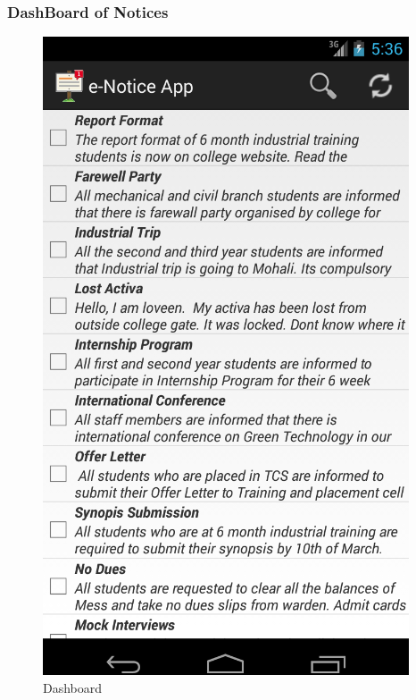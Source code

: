 \documentclass{beamer}   %
\begin{document}
\begin{frame}
\frametitle{DashBoard of Notices}
\begin{figure}
\includegraphics[scale=0.2]{image/dashboard.png}
\caption{Dashboard}
\end{figure}
\end{frame}
\end{document}
